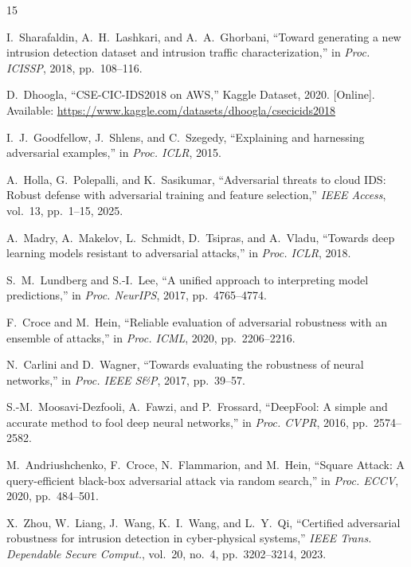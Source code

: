 \documentclass[conference]{IEEEtran}
\begin{document}
\begin{thebibliography}{15}

I.~Sharafaldin, A.~H.~Lashkari, and A.~A.~Ghorbani, ``Toward generating a new intrusion detection dataset and intrusion traffic characterization,'' in \emph{Proc. ICISSP}, 2018, pp.~108--116.

D.~Dhoogla, ``CSE-CIC-IDS2018 on AWS,'' Kaggle Dataset, 2020. [Online]. Available: \url{https://www.kaggle.com/datasets/dhoogla/csecicids2018}

I.~J.~Goodfellow, J.~Shlens, and C.~Szegedy, ``Explaining and harnessing adversarial examples,'' in \emph{Proc. ICLR}, 2015.

A.~Holla, G.~Polepalli, and K.~Sasikumar, ``Adversarial threats to cloud IDS: Robust defense with adversarial training and feature selection,'' \emph{IEEE Access}, vol.~13, pp.~1--15, 2025.

A.~Madry, A.~Makelov, L.~Schmidt, D.~Tsipras, and A.~Vladu, ``Towards deep learning models resistant to adversarial attacks,'' in \emph{Proc. ICLR}, 2018.

S.~M.~Lundberg and S.-I.~Lee, ``A unified approach to interpreting model predictions,'' in \emph{Proc. NeurIPS}, 2017, pp.~4765--4774.

F.~Croce and M.~Hein, ``Reliable evaluation of adversarial robustness with an ensemble of attacks,'' in \emph{Proc. ICML}, 2020, pp.~2206--2216.

N.~Carlini and D.~Wagner, ``Towards evaluating the robustness of neural networks,'' in \emph{Proc. IEEE S\&P}, 2017, pp.~39--57.

S.-M.~Moosavi-Dezfooli, A.~Fawzi, and P.~Frossard, ``DeepFool: A simple and accurate method to fool deep neural networks,'' in \emph{Proc. CVPR}, 2016, pp.~2574--2582.

M.~Andriushchenko, F.~Croce, N.~Flammarion, and M.~Hein, ``Square Attack: A query-efficient black-box adversarial attack via random search,'' in \emph{Proc. ECCV}, 2020, pp.~484--501.

X.~Zhou, W.~Liang, J.~Wang, K.~I.~Wang, and L.~Y.~Qi, ``Certified adversarial robustness for intrusion detection in cyber-physical systems,'' \emph{IEEE Trans. Dependable Secure Comput.}, vol.~20, no.~4, pp.~3202--3214, 2023.


\end{thebibliography}
\end{document}
